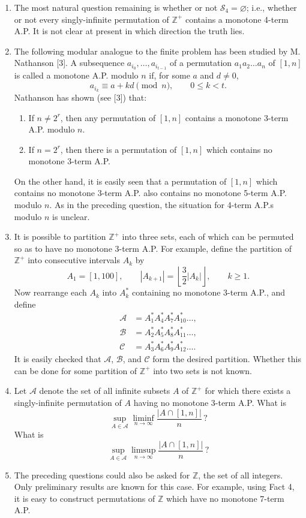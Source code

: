 \documentclass[10pt]{article}
\newcommand{\Zpos}{\mathbb{Z}^{+}}
\newcommand{\Scal}{\mathscr{S}}
\begin{document}
\begin{enumerate}[leftmargin=2.2em]
\item The most natural question remaining is whether or not
$\Scal_4=\varnothing$; i.e., whether or not every singly-infinite
permutation of $\Zpos$ contains a monotone 4-term A.P. It is not clear at
present in which direction the truth lies.

\item The following modular analogue to the finite problem has been
studied by M. Nathanson [3]. A subsequence
$a_{i_0},\ldots,a_{i_{t-1}}$ of a permutation $a_1a_2\ldots a_n$ of
$[1,n]$ is called a monotone A.P. modulo $n$ if, for some $a$ and
$d\ne0$,
\[
 a_{i_k}\equiv a+kd\pmod n,\qquad 0\le k<t.
\]
Nathanson has shown (see [3]) that:
\begin{enumerate}[label=(\roman*),leftmargin=2.3em]
\item If $n\ne2^r$, then any permutation of $[1,n]$ contains a monotone
3-term A.P. modulo $n$.
\item If $n=2^r$, then there is a permutation of $[1,n]$ which contains
no monotone 3-term A.P.
\end{enumerate}
On the other hand, it is easily seen that a permutation of $[1,n]$ which
contains no monotone 3-term A.P. also contains no monotone 5-term A.P.
modulo $n$. As in the preceding question, the situation for 4-term A.P.s
modulo $n$ is unclear.

\item It is possible to partition $\Zpos$ into three sets, each of which
can be permuted so as to have no monotone 3-term A.P. For example, define
the partition of $\Zpos$ into consecutive intervals $A_k$ by
\[
 A_1=[1,100],
 \qquad
 |A_{k+1}|=\left\lfloor\frac32|A_k|\right\rfloor,
 \qquad k\ge1.
\]
Now rearrange each $A_k$ into $A_k^*$ containing no monotone 3-term A.P.,
and define
\[
 \begin{aligned}
 \mathscr A&=A_1^*A_4^*A_7^*A_{10}^*\ldots,\\
 \mathscr B&=A_2^*A_5^*A_8^*A_{11}^*\ldots,\\
 \mathscr C&=A_3^*A_6^*A_9^*A_{12}^*\ldots.
 \end{aligned}
\]
It is easily checked that $\mathscr A$, $\mathscr B$, and $\mathscr C$
form the desired partition. Whether this can be done for some partition
of $\Zpos$ into two sets is not known.

\item Let $\mathscr A$ denote the set of all infinite subsets $A$ of
$\Zpos$ for which there exists a singly-infinite permutation of $A$
having no monotone 3-term A.P. What is
\[
 \sup_{A\in\mathscr A}\liminf_{n\to\infty}
 \frac{|A\cap[1,n]|}{n}\,?
\]
What is
\[
 \sup_{A\in\mathscr A}\limsup_{n\to\infty}
 \frac{|A\cap[1,n]|}{n}\,?
\]

\item The preceding questions could also be asked for $\mathbb Z$, the
set of all integers. Only preliminary results are known for this case.
For example, using Fact 4, it is easy to construct permutations of
$\mathbb Z$ which have no monotone 7-term A.P.
\end{enumerate}
\end{document}
